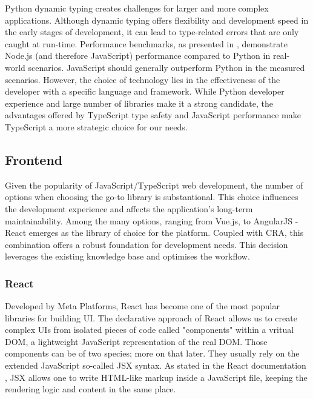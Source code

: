 Python dynamic typing creates challenges for larger and more complex applications.
Although dynamic typing offers flexibility and development speed in the early stages of development, it can lead to type-related errors that are only caught at run-time.
Performance benchmarks, as presented in \cite{PerformancePythonNode}, demonstrate Node.js (and therefore JavaScript) performance compared to Python in real-world scenarios.
JavaScript should generally outperform Python in the measured scenarios.
However, the choice of technology lies in the effectiveness of the developer with a specific language and framework.
While Python developer experience and large number of libraries make it a strong candidate, the advantages offered by TypeScript type safety and JavaScript performance make TypeScript a more strategic choice for our needs.


\subsection{Frontend}
\label{subsec:frontend-library}
Given the popularity of JavaScript/TypeScript web development, the number of options when choosing the go-to library is substantional.
This choice influences the development experience and affects the application's long-term maintainability. 
Among the many options, ranging from Vue.js, to AngularJS - React emerges as the library of choice for the platform. 
Coupled with \ac{CRA}, this combination offers a robust foundation for development needs.
This decision leverages the existing knowledge base and optimises the workflow. 

\subsubsection{React}
Developed by Meta Platforms, React has become one of the most popular libraries for building \ac{UI}.
The declarative approach of React allows us to create complex \ac{UI}s from isolated pieces of code called "components" \cite{react-docs} within a vritual \ac{DOM}, a lightweight JavaScript representation of the real \ac{DOM}.
Those components can be of two species; more on that later.
They usually rely on the extended JavaScript so-called JSX syntax.
As stated in the React documentation \cite{JSX-react-docs}, JSX allows one to write HTML-like markup inside a JavaScript file, keeping the rendering logic and content in the same place.

